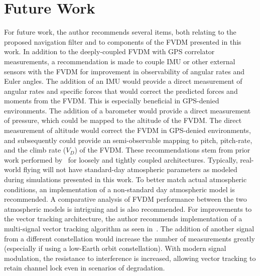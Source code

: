 \section{\textbf{Future Work}}
For future work, the author recommends several items, both relating to the proposed navigation filter and to components of the FVDM presented in this work. In addition to the deeply-coupled FVDM with GPS correlator measurements, a recommendation is made to couple IMU or other external sensors with the FVDM for improvement in observability of angular rates and Euler angles. The addition of an IMU would provide a direct measurement of angular rates and specific forces that would correct the predicted forces and moments from the FVDM\@. This is especially beneficial in GPS-denied environments. The addition of a barometer would provide a direct measurement of pressure, which could be mapped to the altitude of the FVDM\@. The direct measurement of altitude would correct the FVDM in GPS-denied environments, and subsequently could provide an semi-observable mapping to pitch, pitch-rate, and the climb rate (\(V_D\)) of the FVDM\@. These recommendations stem from prior work performed by~\cite{khaghaniAssessmentVDMbasedAutonomous2018,khaghaniAutonomousVehicleDynamic2016,mwenegohaModelbasedTightlyCoupled2020} for loosely and tightly coupled architectures. Typically, real-world flying will not have standard-day atmospheric parameters as modeled during simulations presented in this work.  To better match actual atmospheric conditions, an implementation of a non-standard day atmospheric model is recommended. A comparative analysis of FVDM performance between the two atmospheric models is intriguing and is also recommended. For improvements to the vector tracking architecture, the author recommends implementation of a multi-signal vector tracking algorithm as seen in~\cite{givhanGPSL5Software2021}. The addition of another signal from a different constellation would increase the number of measurements greatly (especially if using a low-Earth orbit constellation). With modern signal modulation, the resistance to interference is increased, allowing vector tracking to retain channel lock even in scenarios of degradation.